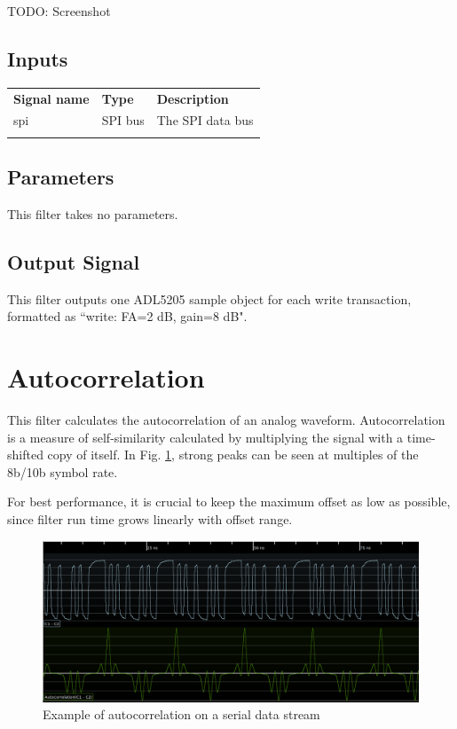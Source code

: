 TODO: Screenshot

\subsection{Inputs}

\begin{tabularx}{16cm}{llX}
\thickhline
\textbf{Signal name} & \textbf{Type} & \textbf{Description} \\
\thickhline
spi & SPI bus & The SPI data bus \\
\thickhline
\end{tabularx}

\subsection{Parameters}

This filter takes no parameters.

\subsection{Output Signal}

This filter outputs one ADL5205 sample object for each write transaction, formatted as ``write: FA=2 dB, gain=8 dB".

\pagebreak
\section{Autocorrelation}
\label{filter:autocorrelation}

This filter calculates the autocorrelation of an analog waveform. Autocorrelation is a measure of self-similarity
calculated by multiplying the signal with a time-shifted copy of itself. In Fig. \ref{filter_accouple}, strong peaks
can be seen at multiples of the 8b/10b symbol rate.

For best performance, it is crucial to keep the maximum offset as low as possible, since filter run time grows linearly
with offset range.

\begin{figure}[h]
\centering
\includegraphics[width=16cm]{images/filters/autocorrelation.png}
\caption{Example of autocorrelation on a serial data stream}
\label{filter_accouple}
\end{figure}

